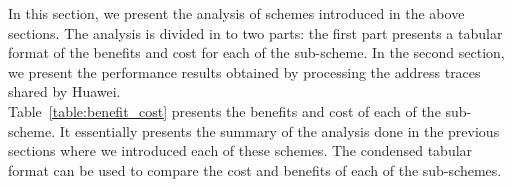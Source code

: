 In this section, we present the analysis of schemes introduced in the above sections. The analysis is divided in to two parts: the first part presents a tabular format of the benefits and cost for each of the sub-scheme. In the second section, we present the performance results obtained by processing the address traces shared by Huawei. \\ 
Table~\ref{table:benefit_cost} presents the benefits and cost of each of the sub-scheme. It essentially presents the summary of the analysis done in the previous sections where we introduced each of these schemes. The condensed tabular format can be used to compare the cost and benefits of each of the sub-schemes. 
\begin{comment} 
\begin{figure}[ht!]
\centering
\texttt{[image: code\_region.jpg]}
\caption{Memory Bank layout}
\label{fig:code_region}
\end{figure}
\end{comment}
